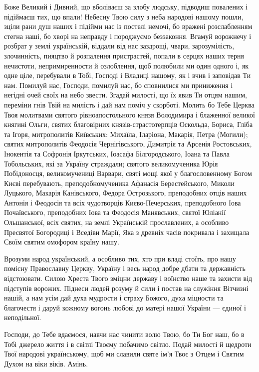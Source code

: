 \documentclass[chapters.tex]{subfiles}
\begin{document}
Боже Великий і Дивний, що вболіваєш за злобу людську, підводиш повалених і підіймаєш тих, що впали! Небесну Твою силу з неба народові нашому пошли, зціли рани душ наших і підійми нас із постелі немочі, бо вражені розслабленням стегна наші, бо хворі на неправду і породжуємо беззаконня. Вгамуй ворожнечу і розбрат у землі українській, віддали від нас заздрощі, чвари, зарозумілість, злочинність, пияцтво й розпалення пристрастей, попали в серцях наших терня нечистоти, непримиренности й озлоблення, щоб полюбили ми один одного і, як одне ціле, перебували в Тобі, Господі і Владиці нашому, як і вчив і заповідав Ти нам. Помилуй нас, Господи, помилуй нас, бо сповнилися ми приниження і негідні очей своїх на небо звести. Згадай милості, що їх явив Ти отцям нашим, переміни гнів Твій на милість і дай нам поміч у скорботі. Молить бо Тебе Церква Твоя молитвами святого рівноапостольного князя Володимира і блаженної великої княгині Ольги, святих благовірних князів-страстотерпців Оскольда, Бориса, Гліба та Ігоря, митрополитів Київських: Михаїла, Іларіона, Макарія, Петра (Могили); святих митрополитів Феодосія Чернігівського, Димитрія та Арсенія Ростовських, Інокентія та Софронія Іркутських, Іоасафа Білгородського, Іоана та Павла Тобольських, які за Україну страждали; святого великомученика Юрія Побідоносця, великомучениці Варвари, святі мощі якої у благословенному Богом Києві перебувають, преподобномученика Афанасія Берестейського, Миколи Луцького, Макарія Канівського, Федора Острозького, преподобних отців наших Антонія і Феодосія та всіх чудотворців Києво-Печерських, преподобного Іова Почаївського, преподобних Іова та Феодосія Манявських, святої Юліанії Ольшанської, всіх святих, на землі Українській прославлених, а особливо Пресвятої Богородиці і Вседіви Марії, Яка з древніх часів покривала і захищала Своїм святим омофором країну нашу.

Врозуми народ український, а особливо тих, хто при владі стоїть, про нашу помісну Православну Церкву, Україну і весь народ добре дбати та державність відстоювати. Силою Хреста Твого зміцни державу і воїнство наше та захисти від підступів ворожих. Піднеси людей розуму й сили і постав на служіння Вітчизні нашій, а нам усім дай духа мудрости і страху Божого, духа міцности та благочестя і даруй кожному вогонь любові до матері нашої України — єдиної і неподільної.

Господи, до Тебе вдаємося, навчи нас чинити волю Твою, бо Ти Бог наш, бо в Тобі джерело життя і в світлі Твоєму побачимо світло. Подай милості й щедроти Твої народові українському, щоб ми славили святе ім’я Твоє з Отцем і Святим Духом на віки віків. Амінь.
\end{document}
